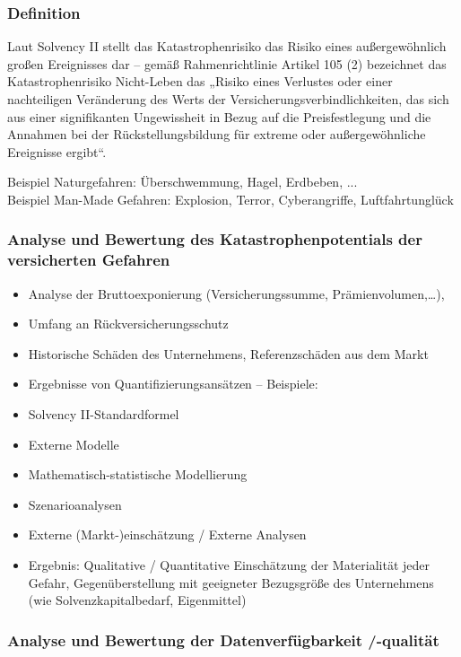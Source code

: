 \documentclass[12pt]{report}
\theoremstyle{dotless}
\theoremstyle{definition}
\begin{document}
\subsubsection{Definition}
Laut Solvency II stellt das Katastrophenrisiko das Risiko eines außergewöhnlich großen Ereignisses dar – gemäß Rahmenrichtlinie Artikel 105 (2) bezeichnet das Katastrophenrisiko Nicht-Leben das „Risiko eines Verlustes oder einer nachteiligen Veränderung des Werts der Versicherungsverbindlichkeiten, das sich aus einer signifikanten Ungewissheit in Bezug auf die Preisfestlegung und die Annahmen bei der Rückstellungsbildung für extreme oder außergewöhnliche Ereignisse ergibt“.

Beispiel Naturgefahren: Überschwemmung, Hagel, Erdbeben, ... \\
Beispiel Man-Made Gefahren: Explosion, Terror, Cyberangriffe, Luftfahrtunglück

\subsubsection{Analyse und Bewertung des Katastrophenpotentials der versicherten Gefahren}

\begin{itemize}
\item Analyse der Bruttoexponierung (Versicherungssumme, Prämienvolumen,…),
\item Umfang an Rückversicherungsschutz
\item Historische Schäden des Unternehmens, Referenzschäden aus dem Markt
\item Ergebnisse von Quantifizierungsansätzen – Beispiele:
\item Solvency II-Standardformel
\item Externe Modelle
\item Mathematisch-statistische Modellierung
\item Szenarioanalysen
\item Externe (Markt-)einschätzung / Externe Analysen
\item Ergebnis: Qualitative / Quantitative Einschätzung der Materialität jeder Gefahr, Gegenüberstellung mit geeigneter Bezugsgröße des Unternehmens (wie Solvenzkapitalbedarf, Eigenmittel)
\end{itemize}


\subsubsection{Analyse und Bewertung der Datenverfügbarkeit /-qualität}
\end{document}
